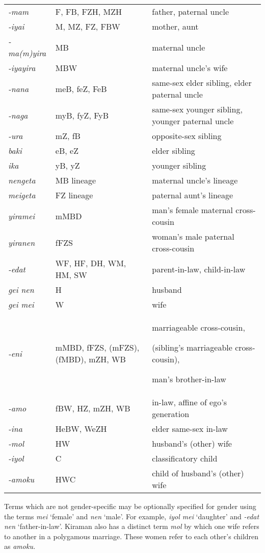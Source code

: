 \begin{center}
\tablehead{}
\begin{supertabular}{m{0.8705598in}m{2.0997598in}m{2.69276in}}
\textit{{}-mam} &
F, FB, FZH, MZH &
father, paternal uncle\\
\textit{{}-iyai} &
M, MZ, FZ, FBW &
mother, aunt\\
\textit{{}-ma(m)yira} &
MB &
maternal uncle\\
\textit{{}-iyayira} &
MBW &
maternal uncle{\textquoteright}s wife\\
\textit{{}-nana} &
meB, feZ, FeB &
same-sex elder sibling, \newline
elder paternal uncle\\
\textit{{}-naga} &
myB, fyZ, FyB &
same-sex younger sibling, \newline
younger paternal uncle\\
\textit{{}-ura} &
mZ, fB &
opposite-sex sibling\\
\textit{baki} &
eB, eZ &
elder sibling\\
\textit{ika} &
yB, yZ &
younger sibling\\
\textit{nengeta} &
MB lineage &
maternal uncle{\textquoteright}s lineage\\
\textit{meigeta} &
FZ lineage &
paternal aunt{\textquoteright}s lineage\\
\textit{yiramei} &
mMBD &
man{\textquoteright}s female maternal cross-cousin\\
\textit{yiranen} &
fFZS &
woman{\textquoteright}s male paternal cross-cousin\\
\textit{{}-edat} &
WF, HF, DH, WM, HM, SW &
parent-in-law, child-in-law\\
\textit{gei nen} &
H &
husband\\
\textit{gei mei} &
W &
wife\\
\textit{{}-eni} &
mMBD, fFZS, (mFZS), (fMBD), mZH, WB &
marriageable cross-cousin, 

(sibling{\textquoteright}s marriageable cross-cousin),

man{\textquoteright}s brother-in-law\\
\textit{{}-amo} &
fBW, HZ, mZH, WB &
in-law, affine of ego{\textquoteright}s generation\\
\textit{{}-ina} &
HeBW, WeZH &
elder same-sex in-law\\
\textit{{}-mol} &
HW &
husband{\textquoteright}s (other) wife\\
\textit{{}-iyol} &
C &
classificatory child\\
\textit{{}-amoku} &
HWC &
child of husband{\textquoteright}s (other) wife\\
\end{supertabular}
\end{center}
Terms which are not gender-specific may be optionally specified for gender using the terms \textit{mei }{\textquoteleft}female{\textquoteright} and \textit{nen }{\textquoteleft}male{\textquoteright}. For example, \textit{iyol mei }{\textquoteleft}daughter{\textquoteright} and \textit{{}-edat nen }{\textquoteleft}father-in-law{\textquoteright}. Kiraman also has a distinct term \textit{mol} by which one wife refers to another in a polygamous marriage. These women refer to each other{\textquoteright}s children as \textit{amoku.} 

